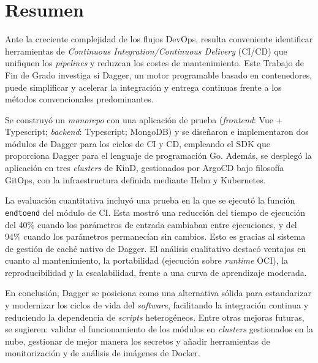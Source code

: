\pagestyle{plain}
\chapter*{Resumen}

Ante la creciente complejidad de los flujos DevOps, resulta conveniente identificar herramientas de \textit{Continuous Integration/Continuous Delivery} (CI/CD) que unifiquen los \textit{pipelines} y reduzcan los costes de mantenimiento. Este Trabajo de Fin de Grado investiga si Dagger, un motor programable basado en contenedores, puede simplificar y acelerar la integración y entrega continuas frente a los métodos convencionales predominantes.

Se construyó un \textit{monorepo} con una aplicación de prueba (\textit{frontend}: Vue + Typescript; \textit{backend}: Typescript; MongoDB) y se diseñaron e implementaron dos módulos de Dagger para los ciclos de CI y CD, empleando el SDK que proporciona Dagger para el lenguaje de programación Go. Además, se desplegó la aplicación en tres \textit{clusters} de KinD, gestionados por ArgoCD bajo filosofía GitOps, con la infraestructura definida mediante Helm y Kubernetes.

La evaluación cuantitativa incluyó una prueba en la que se ejecutó la función \texttt{endtoend} del módulo de CI. Esta mostró una reducción del tiempo de ejecución del 40\% cuando los parámetros de entrada cambiaban entre ejecuciones, y del 94\% cuando los parámetros permanecían sin cambios. Esto es gracias al sistema de gestión de caché nativo de Dagger. El análisis cualitativo destacó ventajas en cuanto al mantenimiento, la portabilidad (ejecución sobre \textit{runtime} OCI), la reproducibilidad y la escalabilidad, frente a una curva de aprendizaje moderada.

En conclusión, Dagger se posiciona como una alternativa sólida para estandarizar y modernizar los ciclos de vida del \textit{software}, facilitando la integración continua y reduciendo la dependencia de \textit{scripts} heterogéneos. Entre otras mejoras futuras, se sugieren: validar el funcionamiento de los módulos en \textit{clusters} gestionados en la nube, gestionar de mejor manera los secretos y añadir herramientas de monitorización y de análisis de imágenes de Docker.

